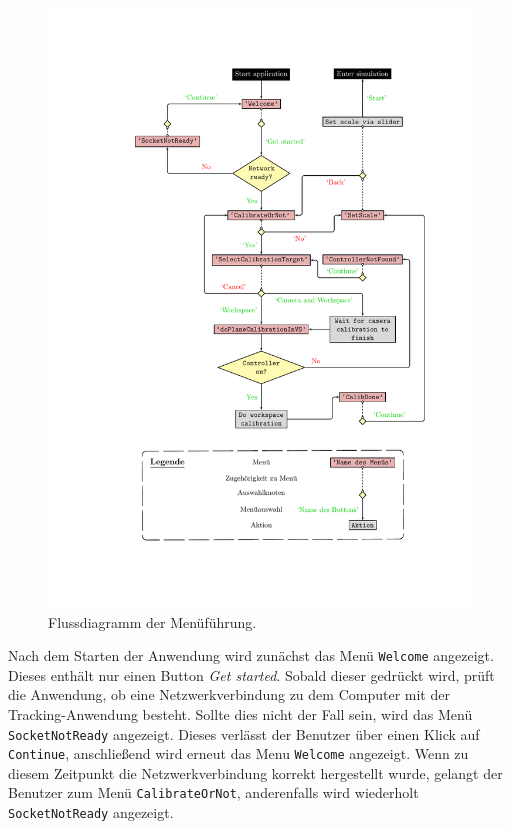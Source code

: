 \begin{figure}[htbp]
	\centering
	\includegraphics[scale=.9, trim=5.5cm 2.5cm 3.5cm 2.5cm]{kapitel/system/MP_Menu_Flowchart.pdf}
	\caption[Flussdiagramm der Menüführung]{Flussdiagramm der Menüführung.}
	\label{fig:menuFlow}
\end{figure}

Nach dem Starten der Anwendung wird zunächst das Menü \texttt{Welcome} angezeigt. Dieses enthält nur einen Button \textit{Get started}. Sobald dieser gedrückt wird, prüft die Anwendung, ob eine Netzwerkverbindung zu dem Computer mit der Tracking-Anwendung besteht. Sollte dies nicht der Fall sein, wird das Menü \texttt{Socket\-Not\-Ready} angezeigt. Dieses verlässt der Benutzer über einen Klick auf \texttt{Continue}, anschließend wird erneut das Menu \texttt{Welcome} angezeigt. Wenn zu diesem Zeitpunkt die Netzwerkverbindung korrekt hergestellt wurde, gelangt der Benutzer zum Menü \texttt{Calibrate\-Or\-Not}, anderenfalls wird wiederholt \texttt{Socket\-Not\-Ready} angezeigt.

